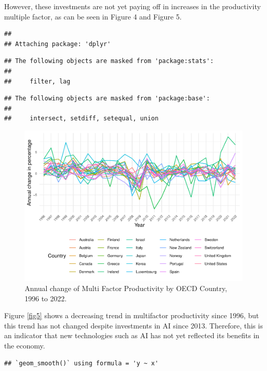 \documentclass[preprint, 3p,
authoryear]{elsarticle} %
\begin{document}
However, these investments are not yet paying off in increases in the
productivity multiple factor, as can be seen in Figure 4 and Figure 5.

\begin{verbatim}
## 
## Attaching package: 'dplyr'
\end{verbatim}

\begin{verbatim}
## The following objects are masked from 'package:stats':
## 
##     filter, lag
\end{verbatim}

\begin{verbatim}
## The following objects are masked from 'package:base':
## 
##     intersect, setdiff, setequal, union
\end{verbatim}

\begin{figure}

{\centering \includegraphics{Document_files/figure-latex/fig4-1} 

}

\caption{\label{fig4}Annual change of Multi Factor Productivity by OECD Country, 1996 to 2022.}\label{fig:fig4}
\end{figure}

Figure \ref{fig5} shows a decreasing trend in multifactor productivity
since 1996, but this trend has not changed despite investments in AI
since 2013. Therefore, this is an indicator that new technologies such
as AI has not yet reflected its benefits in the economy.

\begin{verbatim}
## `geom_smooth()` using formula = 'y ~ x'
\end{verbatim}
\end{document}
